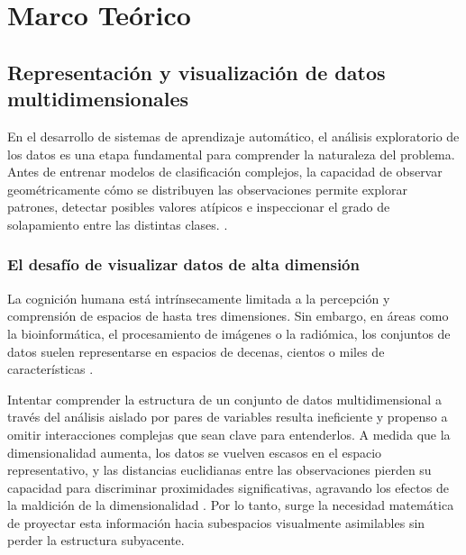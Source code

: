 
\chapter{Marco Teórico}
\label{chap:marco_teorico}



\section{Representación y visualización de datos multidimensionales}
\label{sec:Representacion_Visualizacion}

En el desarrollo de sistemas de aprendizaje automático, el análisis exploratorio de los datos es una etapa fundamental para comprender la naturaleza del problema. Antes de entrenar modelos de clasificación complejos, la capacidad de observar geométricamente cómo se distribuyen las observaciones permite explorar patrones, detectar posibles valores atípicos e inspeccionar el grado de solapamiento entre las distintas clases.
\cite{oettl2024artificial,abukmeil2021survey}. 

\subsection{El desafío de visualizar datos de alta dimensión}

La cognición humana está intrínsecamente limitada a la percepción y comprensión de espacios de hasta tres dimensiones. Sin embargo, en áreas como la bioinformática, el procesamiento de imágenes o la radiómica, los conjuntos de datos suelen representarse en espacios de decenas, cientos o miles de características \cite{PENDIENTE_VisualizacionAltaDimension}. 

Intentar comprender la estructura de un conjunto de datos multidimensional a través del análisis aislado por pares de variables resulta ineficiente y propenso a omitir interacciones complejas que sean clave para entenderlos. A medida que la dimensionalidad aumenta, los datos se vuelven escasos en el espacio representativo, y las distancias euclidianas entre las observaciones pierden su capacidad para discriminar proximidades significativas, agravando los efectos de la maldición de la dimensionalidad \cite{PENDIENTE_MaldicionDimensionalidadDistancias}. Por lo tanto, surge la necesidad matemática de proyectar esta información hacia subespacios visualmente asimilables sin perder la estructura subyacente.

